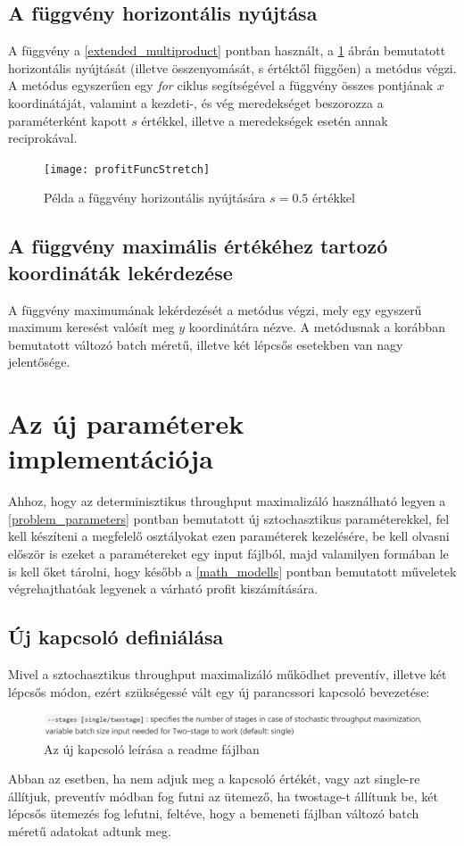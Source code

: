 \subsection{A függvény horizontális nyújtása} \label{stretch}
A függvény a \ref{extended_multiproduct} pontban használt, a \ref{profit_func_stretch} ábrán bemutatott horizontális nyújtását (illetve összenyomását, s értéktől függően) a  metódus végzi.
A metódus egyszerűen egy \textit{for} ciklus segítségével a függvény összes pontjának $x$ koordinátáját, valamint a kezdeti-, és vég meredekséget beszorozza a paraméterként kapott $s$ értékkel, illetve a meredekségek esetén annak reciprokával. 
\begin{figure}
\begin{center}
\texttt{[image: profitFuncStretch]}
\caption{Példa a függvény horizontális nyújtására $s=0.5$ értékkel}
\label{profit_func_stretch}
\end{center}
\end{figure}
\subsection{A függvény maximális értékéhez tartozó koordináták lekérdezése}
A függvény maximumának lekérdezését a  metódus végzi, mely egy egyszerű maximum keresést valósít meg $y$ koordinátára nézve.
A metódusnak a korábban bemutatott változó batch méretű, illetve két lépcsős esetekben van nagy jelentősége.
\section{Az új paraméterek implementációja}
Ahhoz, hogy az determinisztikus throughput maximalizáló használható legyen a \ref{problem_parameters} pontban bemutatott új sztochasztikus paraméterekkel, fel kell készíteni a megfelelő osztályokat ezen paraméterek kezelésére, be kell olvasni először is ezeket a paramétereket egy input fájlból, majd valamilyen formában le is kell őket tárolni, hogy később a \ref{math_modells} pontban bemutatott műveletek végrehajthatóak legyenek a várható profit kiszámítására.
\subsection{Új kapcsoló definiálása}
Mivel a sztochasztikus throughput maximalizáló működhet preventív, illetve két lépcsős módon, ezért szükségessé vált egy új parancssori kapcsoló bevezetése:
\begin{figure}[H]
\begin{center}
\includegraphics[scale=0.38]{switch}
\caption{Az új kapcsoló leírása a readme fájlban}
\label{switch}
\end{center}
\end{figure}
Abban az esetben, ha nem adjuk meg a kapcsoló értékét, vagy azt single-re állítjuk, preventív módban fog futni az ütemező, ha twostage-t állítunk be, két lépcsős ütemezés fog lefutni, feltéve, hogy a bemeneti fájlban változó batch méretű adatokat adtunk meg.
